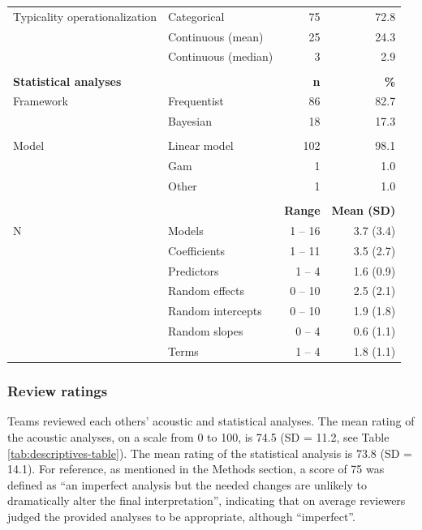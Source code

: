 \documentclass[Review,times,sageh]{sagej}
\begin{document}
\begin{table}
{\begin{tabular}[t]{llrr}
\hspace{1em}Typicality operationalization & Categorical & 75 & 72.8\\
 & Continuous (mean) & 25 & 24.3\\
 & Continuous (median) & 3 & 2.9\\
 &  &  \vphantom{2} & \\
\bf{Statistical analyses} &  & \bf{n} & \bf{\%}\\
\midrule
\hspace{1em}Framework & Frequentist & 86 & 82.7\\
 & Bayesian & 18 & 17.3\\
 &  &  \vphantom{1} & \\
\hspace{1em}Model & Linear model & 102 & 98.1\\
 & Gam & 1 & 1.0\\
 & Other & 1 & 1.0\\
 &  &  & \\
 &  & \bf{Range} & \bf{Mean (SD)}\\
\hspace{1em}N & Models & 1 -- 16 & 3.7 (3.4)\\
 & Coefficients & 1 -- 11 & 3.5 (2.7)\\
 & Predictors & 1 -- 4 & 1.6 (0.9)\\
 & Random effects & 0 -- 10 & 2.5 (2.1)\\
 & Random intercepts & 0 -- 10 & 1.9 (1.8)\\
 & Random slopes & 0 -- 4 & 0.6 (1.1)\\
 & Terms & 1 -- 4 & 1.8 (1.1)\\
\bottomrule
\end{tabular}}
\end{table}

\hypertarget{review-ratings}{%
\subsubsection{Review ratings}\label{review-ratings}}

Teams reviewed each others' acoustic and statistical analyses.
The mean rating of the acoustic analyses, on a scale from 0 to 100, is 74.5 (SD = 11.2, see Table \ref{tab:descriptives-table}).
The mean rating of the statistical analysis is 73.8 (SD = 14.1).
For reference, as mentioned in the Methods section, a score of 75 was defined as ``an imperfect analysis but the needed changes are unlikely to dramatically alter the final interpretation'', indicating that on average reviewers judged the provided analyses to be appropriate, although ``imperfect''.
\end{document}

